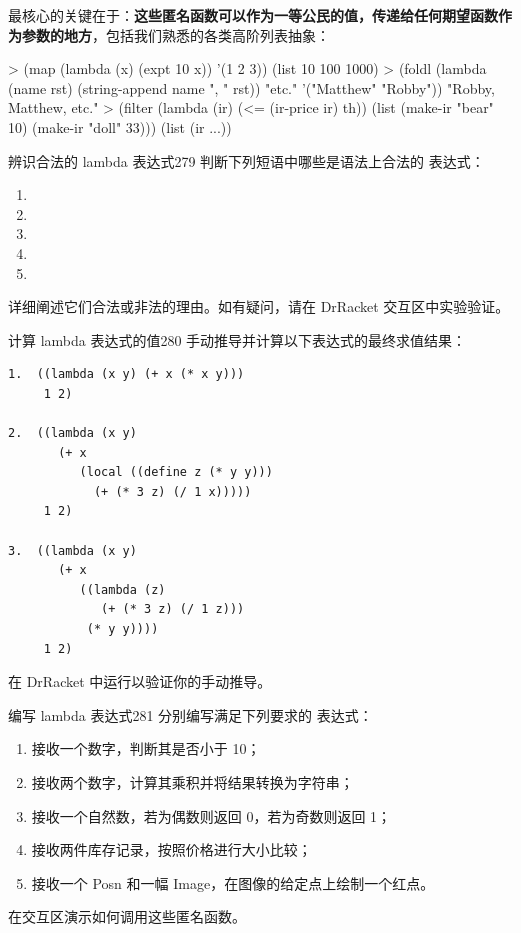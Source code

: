 最核心的关键在于：\textbf{这些匿名函数可以作为一等公民的值，传递给任何期望函数作为参数的地方}，包括我们熟悉的各类高阶列表抽象：

\begin{replbox}
> (map (lambda (x) (expt 10 x))
       '(1 2 3))
(list 10 100 1000)
> (foldl (lambda (name rst)
           (string-append name ", " rst))
         "etc."
         '("Matthew" "Robby"))
"Robby, Matthew, etc."
> (filter (lambda (ir) (<= (ir-price ir) th))
          (list (make-ir "bear" 10)
                (make-ir "doll" 33)))
(list (ir ...))
\end{replbox}

\begin{exercise}{辨识合法的 lambda 表达式}{279}
判断下列短语中哪些是语法上合法的  表达式：
\begin{enumerate}
  \item {}
  \item {}
  \item {}
  \item {}
  \item {}
\end{enumerate}
详细阐述它们合法或非法的理由。如有疑问，请在 DrRacket 交互区中实验验证。
\end{exercise}

\begin{exercise}{计算 lambda 表达式的值}{280}
手动推导并计算以下表达式的最终求值结果：

\begin{stepperbox}
\begin{Verbatim}[commandchars=\\\{\}, fontsize=\footnotesize]
1.  ((lambda (x y) (+ x (* x y)))
     1 2)

2.  ((lambda (x y)
       (+ x
          (local ((define z (* y y)))
            (+ (* 3 z) (/ 1 x)))))
     1 2)

3.  ((lambda (x y)
       (+ x
          ((lambda (z)
             (+ (* 3 z) (/ 1 z)))
           (* y y))))
     1 2)
\end{Verbatim}
\end{stepperbox}

在 DrRacket 中运行以验证你的手动推导。
\end{exercise}

\begin{exercise}{编写 lambda 表达式}{281}
分别编写满足下列要求的  表达式：
\begin{enumerate}
  \item 接收一个数字，判断其是否小于 10；
  \item 接收两个数字，计算其乘积并将结果转换为字符串；
  \item 接收一个自然数，若为偶数则返回 0，若为奇数则返回 1；
  \item 接收两件库存记录，按照价格进行大小比较；
  \item 接收一个 Posn 和一幅 Image，在图像的给定点上绘制一个红点。
\end{enumerate}
在交互区演示如何调用这些匿名函数。
\end{exercise}

